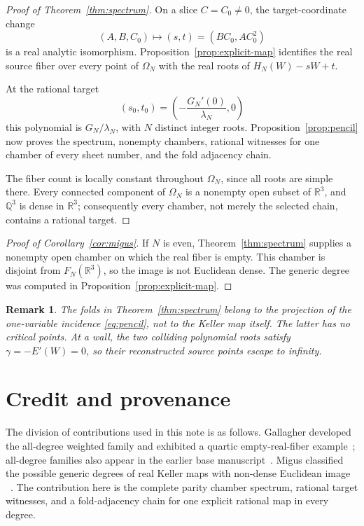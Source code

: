 \documentclass[11pt]{article}
\newtheorem{remark}[theorem]{Remark}
\newcommand{\R}{\mathbb R}
\newcommand{\Q}{\mathbb Q}
\numberwithin{equation}{section}
\begin{document}
\begin{proof}[Proof of Theorem~\ref{thm:spectrum}]
On a slice \(C=C_0\neq0\), the target-coordinate change
\[
 (A,B,C_0)\longmapsto(s,t)
   =(BC_0,AC_0^2)
\]
is a real analytic isomorphism.  Proposition~\ref{prop:explicit-map}
identifies the real source fiber over every point of \(\Omega_N\) with the
real roots of \(H_N(W)-sW+t\).

At the rational target
\[
 (s_0,t_0)=\left(-\frac{G_N'(0)}{\lambda_N},0\right)
\]
this polynomial is \(G_N/\lambda_N\), with \(N\) distinct integer roots.
Proposition~\ref{prop:pencil} now proves the spectrum, nonempty chambers,
rational witnesses for one chamber of every sheet number, and the fold
adjacency chain.

The fiber count is locally constant throughout \(\Omega_N\), since all roots
are simple there.  Every connected component of \(\Omega_N\) is a nonempty
open subset of \(\R^3\), and \(\Q^3\) is dense in \(\R^3\); consequently
every chamber, not merely the selected chain, contains a rational target.
\end{proof}

\begin{proof}[Proof of Corollary~\ref{cor:migus}]
If \(N\) is even, Theorem~\ref{thm:spectrum} supplies a nonempty open chamber
on which the real fiber is empty.  This chamber is disjoint from
\(F_N(\R^3)\), so the image is not Euclidean dense.  The generic degree was
computed in Proposition~\ref{prop:explicit-map}.
\end{proof}

\begin{remark}
The folds in Theorem~\ref{thm:spectrum} belong to the projection of the
one-variable incidence \eqref{eq:pencil}, not to the Keller map itself.  The latter has
no critical points.  At a wall, the two colliding polynomial roots satisfy
\(\gamma=-E'(W)=0\), so their reconstructed source points escape to infinity.
\end{remark}

\section*{Credit and provenance}

The division of contributions used in this note is as follows.  Gallagher
developed the all-degree weighted family and exhibited a quartic
empty-real-fiber example~\cite{Gallagher}; all-degree families also appear in
the earlier base manuscript~\cite{Base}.  Migus classified the possible
generic degrees of real Keller maps with non-dense Euclidean image
~\cite{Migus}.  The contribution here is the complete parity chamber spectrum,
rational target witnesses, and a fold-adjacency chain for one explicit
rational map in every degree.
\end{document}
